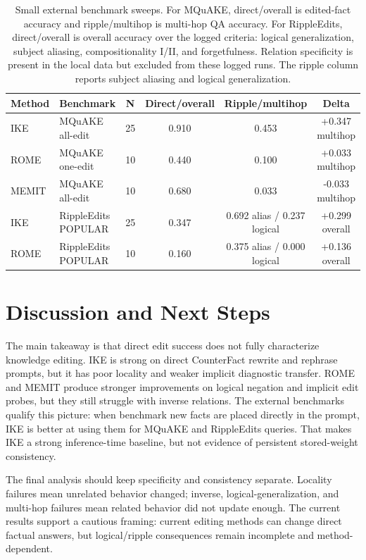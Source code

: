\documentclass[11pt]{article}
\begin{document}
\begin{table}[t]
\centering
\small
\begin{tabular}{llcccc}
\toprule
Method & Benchmark & N & Direct/overall & Ripple/multihop & Delta \\
\midrule
IKE & MQuAKE all-edit & 25 & 0.910 & 0.453 & +0.347 multihop \\
ROME & MQuAKE one-edit & 10 & 0.440 & 0.100 & +0.033 multihop \\
MEMIT & MQuAKE all-edit & 10 & 0.680 & 0.033 & -0.033 multihop \\
IKE & RippleEdits POPULAR & 25 & 0.347 & 0.692 alias / 0.237 logical & +0.299 overall \\
ROME & RippleEdits POPULAR & 10 & 0.160 & 0.375 alias / 0.000 logical & +0.136 overall \\
\bottomrule
\end{tabular}
\caption{Small external benchmark sweeps. For MQuAKE, direct/overall is edited-fact accuracy and ripple/multihop is multi-hop QA accuracy. For RippleEdits, direct/overall is overall accuracy over the logged criteria: logical generalization, subject aliasing, compositionality I/II, and forgetfulness. Relation specificity is present in the local data but excluded from these logged runs. The ripple column reports subject aliasing and logical generalization.}
\label{tab:external}
\end{table}

\section{Discussion and Next Steps}

The main takeaway is that direct edit success does not fully characterize knowledge editing. IKE is strong on direct CounterFact rewrite and rephrase prompts, but it has poor locality and weaker implicit diagnostic transfer. ROME and MEMIT produce stronger improvements on logical negation and implicit edit probes, but they still struggle with inverse relations. The external benchmarks qualify this picture: when benchmark new facts are placed directly in the prompt, IKE is better at using them for MQuAKE and RippleEdits queries. That makes IKE a strong inference-time baseline, but not evidence of persistent stored-weight consistency.

The final analysis should keep specificity and consistency separate. Locality failures mean unrelated behavior changed; inverse, logical-generalization, and multi-hop failures mean related behavior did not update enough. The current results support a cautious framing: current editing methods can change direct factual answers, but logical/ripple consequences remain incomplete and method-dependent.
\end{document}
